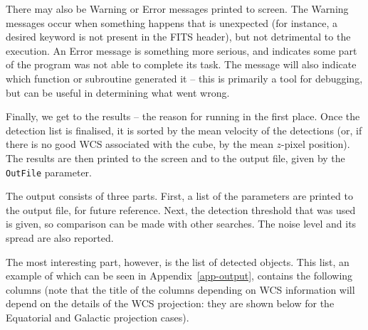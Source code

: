 There may also be Warning or Error messages printed to screen. The
Warning messages occur when something happens that is unexpected (for
instance, a desired keyword is not present in the FITS header), but
not detrimental to the execution. An Error message is something more
serious, and indicates some part of the program was not able to
complete its task. The message will also indicate which function or
subroutine generated it -- this is primarily a tool for debugging, but
can be useful in determining what went wrong.


\label{sec-results}

Finally, we get to the results -- the reason for running \duchamp in
the first place. Once the detection list is finalised, it is sorted by
the mean velocity of the detections (or, if there is no good WCS
associated with the cube, by the mean $z$-pixel position). The results
are then printed to the screen and to the output file, given by the
\texttt{OutFile} parameter. 

The output consists of three parts. First, a list of the parameters
are printed to the output file, for future reference. Next, the
detection threshold that was used is given, so comparison can be made
with other searches. The noise level and its spread are also reported.

The most interesting part, however, is the list of detected
objects. This list, an example of which can be seen in
Appendix~\ref{app-output}, contains the following columns (note that
the title of the columns depending on WCS information will depend on
the details of the WCS projection: they are shown below for the
Equatorial and Galactic projection cases).

